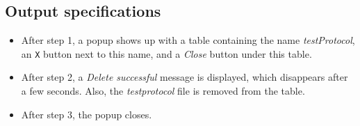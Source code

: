 \subsection*{Output specifications}
\begin{itemize}
\item After step 1, a popup shows up with a table containing the name \emph{testProtocol}, an \texttt{X} button next to this name, and a \emph{Close} button under this table.
\item After step 2, a \emph{Delete successful} message is displayed, which disappears after a few seconds. Also, the \emph{testprotocol} file is removed from the table.
\item After step 3, the popup closes.
\end{itemize}